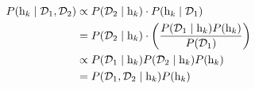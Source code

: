 \begin{align}
    P( \mathrm{h}_{k} \mid \mathcal{D}_1, \mathcal{D}_2 ) 
&\propto P( \mathcal{D}_2 \mid \mathrm{h}_{k} ) \cdot P( \mathrm{h}_{k} \mid \mathcal{D}_1 ) \notag \\
&= P( \mathcal{D}_2 \mid \mathrm{h}_{k} ) \cdot \left( \frac{P( \mathcal{D}_1 \mid \mathrm{h}_{k} ) P( \mathrm{h}_{k} )}{P( \mathcal{D}_1 )} \right) \notag \\
&\propto P( \mathcal{D}_1 \mid \mathrm{h}_{k} ) P( \mathcal{D}_2 \mid \mathrm{h}_{k} ) P( \mathrm{h}_{k} ) \notag \\
&= P( \mathcal{D}_1, \mathcal{D}_2 \mid \mathrm{h}_{k} ) P( \mathrm{h}_{k} )
\label{eq:bayesian_update_1_and_2_step_both}
\end{align}


